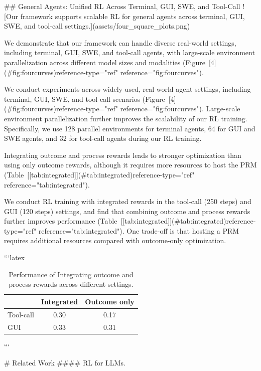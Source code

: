 ## General Agents: Unified RL Across Terminal, GUI, SWE, and Tool-Call
![Our framework supports scalable RL for general agents across terminal, GUI, SWE, and tool-call settings.](assets/four_square_plots.png)


We demonstrate that our framework can handle diverse real-world settings, including terminal, GUI, SWE, and tool-call agents, with large-scale environment parallelization across different model sizes and modalities (Figure [4](#fig:fourcurves)reference-type="ref" reference="fig:fourcurves").

We conduct experiments across widely used, real-world agent settings, including terminal, GUI, SWE, and tool-call scenarios (Figure [4](#fig:fourcurves)reference-type="ref" reference="fig:fourcurves"). Large-scale environment parallelization further improves the scalability of our RL training. Specifically, we use 128 parallel environments for terminal agents, 64 for GUI and SWE agents, and 32 for tool-call agents during our RL training.


Integrating outcome and process rewards leads to stronger optimization than using only outcome rewards, although it requires more resources to host the PRM (Table [[tab:integrated]](#tab:integrated)reference-type="ref" reference="tab:integrated").

We conduct RL training with integrated rewards in the tool-call (250 steps) and GUI (120 steps) settings, and find that combining outcome and process rewards further improves performance (Table [[tab:integrated]](#tab:integrated)reference-type="ref" reference="tab:integrated"). One trade-off is that hosting a PRM requires additional resources compared with outcome-only optimization.


```latex
\begin{table}[h]
\centering
\caption{Performance of Integrating outcome and process rewards across different settings.}
\label{tab:integrated}
\renewcommand{\arraystretch}{1.15}
\begin{tabular}{lcc}
\toprule
 & Integrated & Outcome only \\
\midrule
Tool-call & 0.30 & 0.17 \\
GUI & 0.33 & 0.31 \\
\bottomrule
\end{tabular}
\end{table}
```


# Related Work
#### RL for LLMs.

